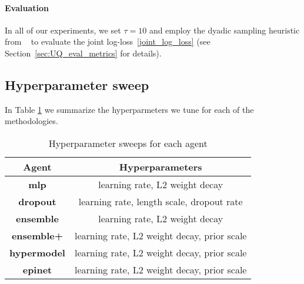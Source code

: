 \paragraph{Evaluation} In all of our experiments, we set $\tau = 10$ and employ the dyadic sampling heuristic from ~\citet{OsbandWenAsDwIbLuRo23} to evaluate the joint log-loss~\eqref{joint_log_loss} (see Section~\ref{sec:UQ_eval_metrics} for details).

\subsection{Hyperparameter  sweep}
\label{sec:UQ_BENCH_hyperparameter-sweep}

In Table \ref{tab:hyperparameter_sweeps} we summarize the hyperparmeters we tune for each of the methodologies.

\begin{table}[h!]
\centering
\begin{tabular}{|c|c|}
\hline
\textbf{Agent} & \textbf{Hyperparameters} \\ \hline
\textbf{mlp} & learning rate, L2 weight decay \\ \hline
\textbf{dropout} & learning rate, length scale, dropout rate \\ \hline
\textbf{ensemble} & learning rate,  L2 weight decay \\ \hline
\textbf{ensemble+} & learning rate,  L2 weight decay, prior scale \\ \hline
\textbf{hypermodel} & learning rate, L2 weight decay, prior scale \\ \hline
\textbf{epinet} & learning rate,  L2 weight decay, prior scale \\ \hline
\end{tabular}
\caption{Hyperparameter sweeps for each agent}
\label{tab:hyperparameter_sweeps}
\end{table}

